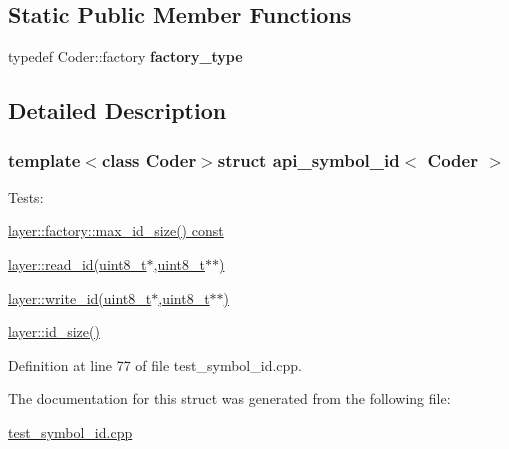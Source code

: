 \subsection*{Static Public Member Functions}
\begin{DoxyCompactItemize}
\item 
\hypertarget{structapi__symbol__id_abb46c663be3b71a167446b73e2421f5b}{typedef Coder\-::factory {\bfseries factory\-\_\-type}}\label{structapi__symbol__id_abb46c663be3b71a167446b73e2421f5b}

\end{DoxyCompactItemize}


\subsection{Detailed Description}
\subsubsection*{template$<$class Coder$>$struct api\-\_\-symbol\-\_\-id$<$ Coder $>$}

Tests\-:
\begin{DoxyItemize}
\item \hyperlink{group__symbol__id__api_gaf38c199730c068ff1695f24067d19887}{layer\-::factory\-::max\-\_\-id\-\_\-size() const}
\item \hyperlink{group__symbol__id__api_ga8df39a52500dd9c57d41af23882e8b60}{layer\-::read\-\_\-id(uint8\-\_\-t$\ast$,uint8\-\_\-t$\ast$$\ast$)}
\item \hyperlink{group__symbol__id__api_ga76aeaeeeafe38e9d4ef34a3395a0f3a9}{layer\-::write\-\_\-id(uint8\-\_\-t$\ast$,uint8\-\_\-t$\ast$$\ast$)}
\item \hyperlink{group__symbol__id__api_ga382b6aceb7bc0139f35005d2fba76dfa}{layer\-::id\-\_\-size()} 
\end{DoxyItemize}

Definition at line 77 of file test\-\_\-symbol\-\_\-id.\-cpp.



The documentation for this struct was generated from the following file\-:\begin{DoxyCompactItemize}
\item 
\hyperlink{test__symbol__id_8cpp}{test\-\_\-symbol\-\_\-id.\-cpp}\end{DoxyCompactItemize}
